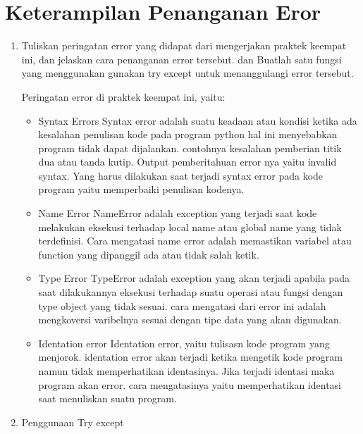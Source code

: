 \section{Keterampilan Penanganan Eror}
\begin{enumerate}
	\item Tuliskan  peringatan  error  yang  didapat  dari  mengerjakan  praktek  keempat  ini, dan  jelaskan  cara  penanganan  error  tersebut.   dan  Buatlah  satu  fungsi  yang menggunakan gunakan try except untuk menanggulangi error tersebut.
	
	Peringatan error di praktek keempat ini, yaitu:
	\begin{itemize}
		\item Syntax Errors
		Syntax error adalah suatu keadaan atau kondisi ketika ada kesalahan penulisan kode pada program python hal ini menyebabkan program tidak dapat dijalankan. contohnya kesalahan pemberian titik dua atau tanda kutip. Output pemberitahuan error nya yaitu invalid syntax. Yang harus dilakukan saat terjadi syntax error pada kode program yaitu memperbaiki penulisan kodenya.
		
		\item Name Error
		NameError adalah exception yang terjadi saat kode melakukan eksekusi terhadap local name atau global name yang tidak terdefinisi. Cara mengatasi name error adalah memastikan variabel atau function yang dipanggil ada atau tidak salah ketik.
		
		\item Type Error
		TypeError adalah exception yang akan terjadi apabila pada saat dilakukannya eksekusi terhadap suatu operasi atau fungsi dengan type object yang tidak sesuai. cara mengatasi dari error ini adalah mengkoversi varibelnya sesuai dengan tipe data yang akan digunakan.
		
		\item Identation error
        Identation error, yaitu tulisasn kode program yang menjorok. identation error akan terjadi ketika mengetik kode program namun tidak memperhatikan identasinya. Jika terjadi identasi maka program akan error. cara mengatasinya yaitu memperhatikan identasi saat menuliskan suatu program.
\end{itemize}
\newpage
	\item Penggunaan Try except
	
\end{enumerate}

